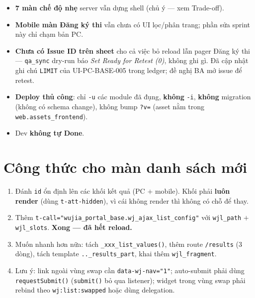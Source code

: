 \begin{itemize}
  \item \textbf{7 màn chế độ nhẹ} server vẫn dựng shell (chủ ý --- xem Trade-off).
  \item \textbf{Mobile màn Đăng ký thi} vẫn chưa có UI lọc/phân trang; phần sửa sprint này chỉ
    chạm bản PC.
  \item \textbf{Chưa có Issue ID trên sheet} cho cả việc bỏ reload lẫn pager Đăng ký thi ---
    \texttt{qa\_sync} dry-run báo \emph{Set Ready for Retest (0)}, không ghi gì. Đã cập nhật ghi
    chú \texttt{LIMIT} của UI-PC-BASE-005 trong ledger; đề nghị BA mở issue để retest.
  \item \textbf{Deploy thủ công}: chỉ \texttt{-u} các module đã đụng, \textbf{không} \texttt{-i},
    \textbf{không} migration (không có schema change), không bump \texttt{?v=} (asset nằm trong
    \texttt{web.assets\_frontend}).
  \item Dev \textbf{không tự Done}.
\end{itemize}

\section{Công thức cho màn danh sách mới}

\begin{enumerate}
  \item Đánh \texttt{id} ổn định lên các khối kết quả (PC $+$ mobile). Khối phải
    \textbf{luôn render} (dùng \texttt{t-att-hidden}), vì cái không render thì không có chỗ để thay.
  \item Thêm \texttt{t-call="wujia\_portal\_base.wj\_ajax\_list\_config"} với
    \texttt{wjl\_path} $+$ \texttt{wjl\_slots}. \textbf{Xong --- đã hết reload.}
  \item Muốn nhanh hơn nữa: tách \texttt{\_xxx\_list\_values()}, thêm route \texttt{/results}
    (3 dòng), tách template \texttt{..\_results\_part}, khai thêm \texttt{wjl\_fragment}.
  \item Lưu ý: link ngoài vùng swap cần \texttt{data-wj-nav="1"}; auto-submit phải dùng
    \texttt{requestSubmit()} (\texttt{submit()} bỏ qua listener); widget trong vùng swap phải
    rebind theo \texttt{wj:list:swapped} hoặc dùng delegation.
\end{enumerate}
